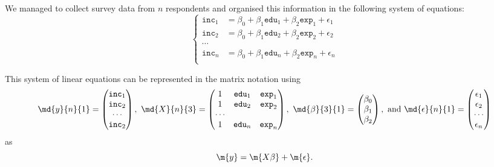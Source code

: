 We managed to collect survey data from $n$ respondents and organised this information in the following system of equations:
\begin{equation}
  \left\{
    \begin{aligned}
      \texttt{inc}_1 &= \beta_0+\beta_1\texttt{edu}_1+\beta_2\texttt{exp}_1+\epsilon_1\\
      \texttt{inc}_2 &= \beta_0+\beta_1\texttt{edu}_2+\beta_2\texttt{exp}_2+\epsilon_2\\
      \cdots\\
      \texttt{inc}_n &= \beta_0+\beta_1\texttt{edu}_n+\beta_2\texttt{exp}_n+\epsilon_n\\
    \end{aligned}
  \right.
\end{equation}

This system of linear equations can be represented in the matrix notation using
\begin{equation}
  \md{y}{n}{1}=
    \begin{pmatrix}
      \texttt{inc}_1\\
      \texttt{inc}_2\\
      \cdots\\
      \texttt{inc}_2\\
    \end{pmatrix},\ %
  \md{X}{n}{3}=
    \begin{pmatrix}
      1     &\texttt{edu}_1     &\texttt{exp}_1\\
      1     &\texttt{edu}_2     &\texttt{exp}_2\\
      \cdots\\
      1     &\texttt{edu}_n     &\texttt{exp}_n\\
    \end{pmatrix},\ %
  \md{\beta}{3}{1}=
    \begin{pmatrix}
      \beta_0\\
      \beta_1\\
      \beta_2\\
    \end{pmatrix},\ \text{and}\ %
  \md{\epsilon}{n}{1}=
    \begin{pmatrix}
      \epsilon_1\\
      \epsilon_2\\
      \cdots\\
      \epsilon_n\\
    \end{pmatrix}
  \end{equation}
as
\begin{equation}\label{Eq.setup}
  \m{y}=\m{X\beta}+\m{\epsilon}.
\end{equation}

